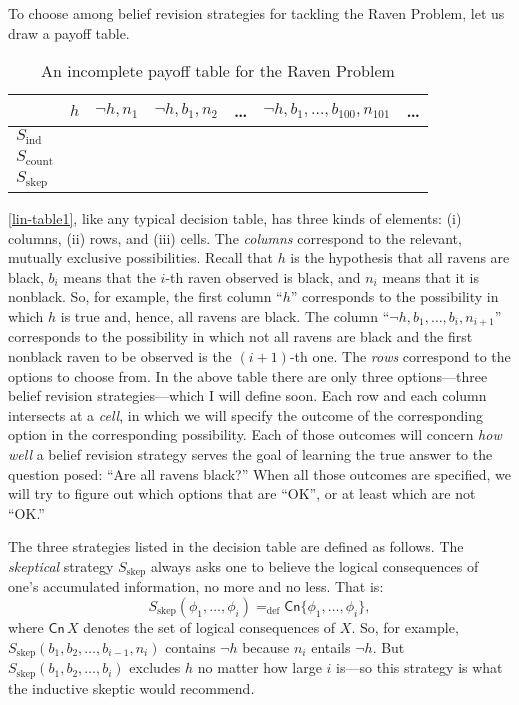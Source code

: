 To choose among belief revision strategies for tackling the Raven Problem, let us draw a payoff table.
\begin{table}[ht]
\centering
\begin{tabular}{lcccccc}
	\hline
	& $h$ & $\neg h, n_1$ & $\neg h, b_1, n_2$ & \ldots & $\neg h, b_1, \ldots, b_{100}, n_{101}$ & \ldots 
\\ \hline\hline
  	$S_{\textrm{ind}}$ &&&&&& \\
  	$S_{\textrm{count}}$ &&&&&& \\
		$S_{\textrm{skep}}$ &&&&&& \\
	\hline
\end{tabular}
\caption{An incomplete payoff table for the Raven Problem}\label{lin-table1}
\end{table}
\autoref{lin-table1}, like any typical decision table, has three kinds of elements: (i) columns, (ii) rows, and (iii) cells. The {\em columns} correspond to the relevant, mutually exclusive possibilities. Recall that $h$ is the hypothesis that all ravens are black, $b_i$ means that the $i$-th raven observed is black, and $n_i$ means that it is nonblack. So, for example, the first column ``$h$'' corresponds to the possibility in which $h$ is true and, hence, all ravens are black. The column ``$\neg h, b_1, \dots, b_i, n_{i+1}$'' corresponds to the possibility in which not all ravens are black and the first nonblack raven to be observed is the $(i+1)$-th one. The {\em rows} correspond to the options to choose from. In the above table there are only three options---three belief revision strategies---which I will define soon. Each row and each column intersects at a {\em cell}, in which we will specify the outcome of the corresponding option in the corresponding possibility. Each of those outcomes will concern {\em how well} a belief revision strategy serves the goal of learning the true answer to the question posed: ``Are all ravens black?'' When all those outcomes are specified, we will try to figure out which options that are ``OK'', or at least which are not ``OK.'' 

The three strategies listed in the decision table are defined as follows. The {\em skeptical} strategy $S_{\textrm{skep}}$ always asks one to believe the logical consequences of one's accumulated information, no more and no less. That is:
$$S_{\textrm{skep}}(\phi_1, \ldots, \phi_i) =_\text{def} \mathsf{Cn}\{\phi_1, \ldots, \phi_i\},$$
where $\mathsf{Cn}\,X$ denotes the set of logical consequences of $X$. So, for example, $S_{\textrm{skep}}(b_1, b_2, \dots, b_{i-1}, n_i)$ contains $\neg h$ because $n_i$ entails $\neg h$. But $S_{\textrm{skep}}(b_1, b_2, \dots, b_i)$ excludes $h$ no matter how large $i$ is---so this strategy is what the inductive skeptic would recommend.  

